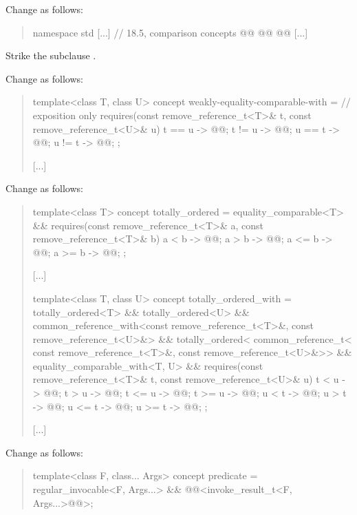 Change  as follows:
\begin{quote}
\begin{codeblock}
namespace std {
  [...]
  // 18.5, comparison concepts
  @@
  @@
    @@
  [...]
}
\end{codeblock}
\end{quote}

Strike the subclause .

Change  as follows:
\begin{quote}
\begin{codeblock}
template<class T, class U>
  concept weakly-equality-comparable-with = // exposition only
    requires(const remove_reference_t<T>& t,
             const remove_reference_t<U>& u) {
      { t == u } -> @@;
      { t != u } -> @@;
      { u == t } -> @@;
      { u != t } -> @@;
    };
\end{codeblock}
[...]
\end{quote}

Change  as follows:
\begin{quote}
\begin{codeblock}
template<class T>
  concept totally_ordered =
    equality_comparable<T> &&
    requires(const remove_reference_t<T>& a,
             const remove_reference_t<T>& b) {
      { a <  b } -> @@;
      { a >  b } -> @@;
      { a <= b } -> @@;
      { a >= b } -> @@;
    };
\end{codeblock}
[...]
\begin{codeblock}
template<class T, class U>
  concept totally_ordered_with =
    totally_ordered<T> && totally_ordered<U> &&
    common_reference_with<const remove_reference_t<T>&, const remove_reference_t<U>&> &&
    totally_ordered<
      common_reference_t<
        const remove_reference_t<T>&,
        const remove_reference_t<U>&>> &&
    equality_comparable_with<T, U> &&
    requires(const remove_reference_t<T>& t,
             const remove_reference_t<U>& u) {
      { t <  u } -> @@;
      { t >  u } -> @@;
      { t <= u } -> @@;
      { t >= u } -> @@;
      { u <  t } -> @@;
      { u >  t } -> @@;
      { u <= t } -> @@;
      { u >= t } -> @@;
    };
\end{codeblock}
[...]
\end{quote}

Change  as follows:
\begin{quote}
\begin{codeblock}
template<class F, class... Args>
  concept predicate =
    regular_invocable<F, Args...> &&
    @@<invoke_result_t<F, Args...>@@>;
\end{codeblock}
\end{quote}
